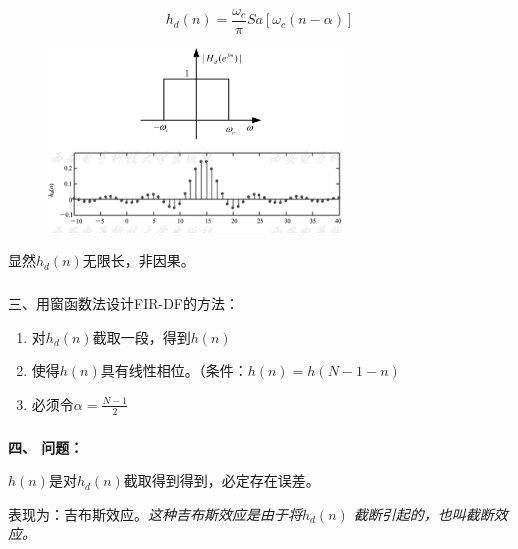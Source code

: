 \documentclass[notheorems,compress,mathserif,table]{beamer}
\begin{document}
\begin{frame}[shrink]\frametitle{}%
$$h_d(n)=\frac{\omega_c}{\pi}Sa\left[\omega_c(n-\alpha)\right]$$
\begin{figure}[h]
    \centering
    \includegraphics[width=0.7\textwidth]{fig1_lixianglvboqi.jpg}
\end{figure}
显然$h_d(n)$无限长，非因果。
\end{frame}


\begin{frame}\frametitle{}%

三、用窗函数法设计FIR-DF的方法：
      \begin{enumerate}
        \item 对$h_d(n)$截取一段，得到$h(n)$
        \item 使得$h(n)$具有线性相位。（条件：$h(n) = h(N-1-n)$
        \item 必须令$\alpha = \frac{N-1}{2}$
      \end{enumerate}
\end{frame}


\begin{frame}\frametitle{}%



  \textbf{四、 问题：}

      $h(n)$是对$h_d(n)$截取得到得到，必定存在误差。

      表现为：吉布斯效应。\emph{这种吉布斯效应是由于将$h_d(n)$ 截断引起的，也叫截断效应。}



\end{frame}
\end{document}
